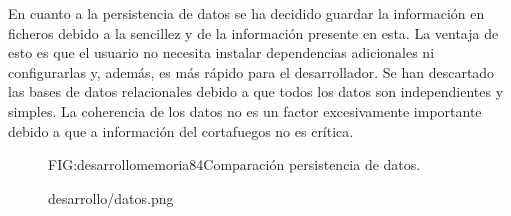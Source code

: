 En cuanto a la persistencia de datos se ha decidido guardar la información en ficheros debido a la sencillez y de la información presente en esta. La ventaja de esto es que el usuario no necesita instalar dependencias adicionales ni configurarlas y, además, es más rápido para el desarrollador. Se han descartado las bases de datos relacionales debido a que todos los datos son independientes y simples. La coherencia de los datos no es un factor excesivamente importante debido a que a información del cortafuegos no es crítica.
\begin{figure}[Comparación persistencia de datos.]{FIG:desarrollomemoria84}{Comparación persistencia de datos.}
  \begin{image}{}{}{desarrollo/datos.png}
  \end{image}
\end{figure}